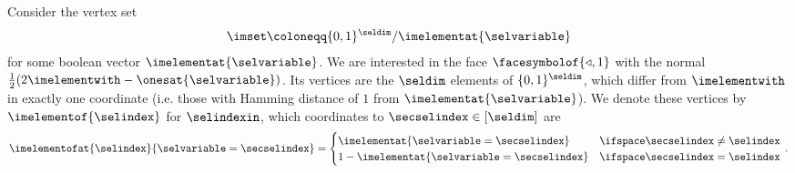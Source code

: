 \begin{example}
    \label{exa:tt_diagonal_face}
    Consider the vertex set
    \begin{align*}
        \imset \coloneqq \{0,1\}^{\seldim} / \imelementat{\selvariable}
    \end{align*}
    for some boolean vector $\imelementat{\selvariable}$.
    We are interested in the face $\facesymbolof{\triangleleft,1}$ with the normal $\frac{1}{2} (2\imelementwith - \onesat{\selvariable})$.
    Its vertices are the $\seldim$ elements of $\{0,1\}^{\seldim}$, which differ from $\imelementwith$ in exactly one coordinate (i.e. those with Hamming distance of $1$ from $\imelementat{\selvariable}$).
    We denote these vertices by $\imelementof{\selindex}$ for $\selindexin$, which coordinates to $\secselindex\in[\seldim]$ are
    \begin{align*}
        \imelementofat{\selindex}{\selvariable=\secselindex}
        = \begin{cases}
              \imelementat{\selvariable=\secselindex} & \ifspace \secselindex\neq\selindex \\
              1-\imelementat{\selvariable=\secselindex} & \ifspace \secselindex=\selindex
        \end{cases} \, .
    \end{align*}


\end{example}
